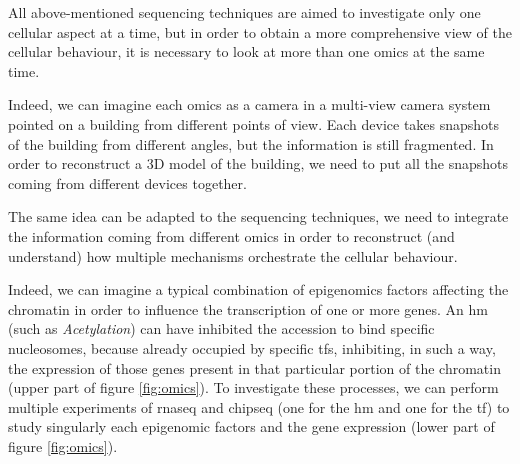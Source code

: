 All above-mentioned sequencing techniques are aimed to investigate only one cellular aspect at a time, but in order to obtain a more comprehensive view of the cellular behaviour, it is necessary to look at more than one omics at the same time.


Indeed, we can imagine each omics as a camera in a multi-view camera system pointed on a building from different points of view.
Each device takes snapshots of the building from different angles, but the information is still fragmented.
In order to reconstruct a 3D model of the building, we need to put all the snapshots coming from different devices together.

The same idea can be adapted to the sequencing techniques, we need to integrate the information coming from different omics in order to reconstruct (and understand) how multiple mechanisms orchestrate the cellular behaviour.

Indeed, we can imagine a typical combination of epigenomics factors affecting the chromatin in order to influence the transcription of one or more genes.
An \gls{hm} (such as \textit{Acetylation}) can have inhibited the accession to bind specific nucleosomes, because already occupied by specific \glspl{tf}, inhibiting, in such a way, the expression of those genes present in that particular portion of the chromatin (upper part of figure \ref{fig:omics}).
To investigate these processes, we can perform multiple experiments of \gls{rnaseq} and \gls{chipseq} (one for the \gls{hm} and one for the \gls{tf}) to study singularly each epigenomic factors and the gene expression (lower part of figure \ref{fig:omics}). 

